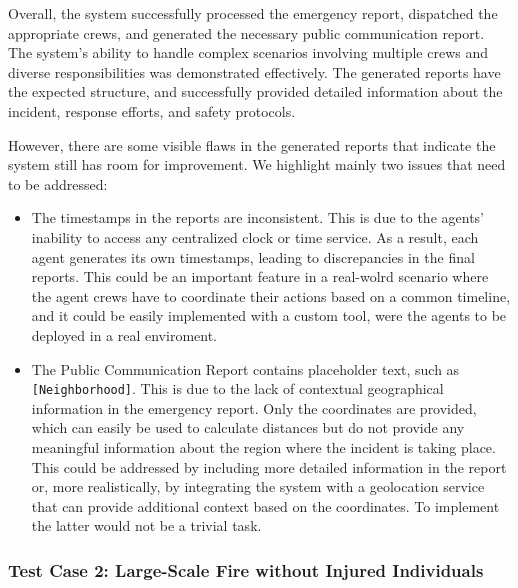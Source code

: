 Overall, the system successfully processed the emergency report, dispatched the appropriate crews, and generated the necessary public communication report. The system's ability to handle complex scenarios involving multiple crews and diverse responsibilities was demonstrated effectively. The generated reports have the expected structure, and successfully provided detailed information about the incident, response efforts, and safety protocols.

However, there are some visible flaws in the generated reports that indicate the system still has room for improvement. We highlight mainly two issues that need to be addressed:
\begin{itemize}
    \item The timestamps in the reports are inconsistent. This is due to the agents' inability to access any centralized clock or time service. As a result, each agent generates its own timestamps, leading to discrepancies in the final reports. This could be an important feature in a real-wolrd scenario where the agent crews have to coordinate their actions based on a common timeline, and it could be easily implemented with a custom tool, were the agents to be deployed in a real enviroment.
    \item The Public Communication Report contains placeholder text, such as \texttt{[Neighborhood]}. This is due to the lack of contextual geographical information in the emergency report. Only the coordinates are provided, which can easily be used to calculate distances but do not provide any meaningful information about the region where the incident is taking place. This could be addressed by including more detailed information in the report or, more realistically, by integrating the system with a geolocation service that can provide additional context based on the coordinates. To implement the latter would not be a trivial task.
\end{itemize}

\subsubsection{Test Case 2: Large-Scale Fire without Injured Individuals}

